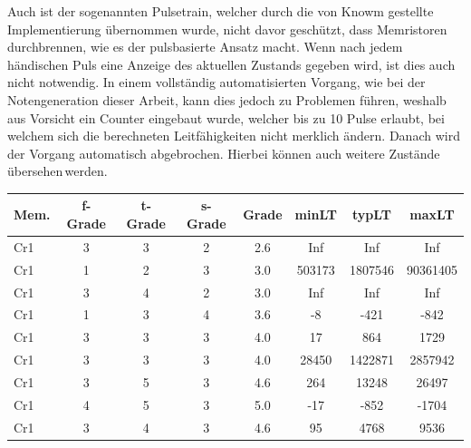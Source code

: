 Auch ist der sogenannten \glqq Pulsetrain\grqq, welcher durch die von Knowm gestellte Implementierung übernommen wurde, nicht davor geschützt, dass Memristoren \glqq durchbrennen\grqq, wie es der pulsbasierte Ansatz macht. Wenn nach jedem händischen Puls eine Anzeige des aktuellen Zustands gegeben wird, ist dies auch nicht notwendig. In einem vollständig automatisierten Vorgang, wie bei der Notengeneration dieser Arbeit, kann dies jedoch zu Problemen führen, weshalb aus Vorsicht ein Counter eingebaut wurde, welcher bis zu 10 Pulse erlaubt, bei welchem sich die berechneten Leitfähigkeiten nicht merklich ändern. Danach wird der Vorgang automatisch abgebrochen. Hierbei können auch weitere Zustände \glqq übersehen\grqq\,werden.

\begin{table}
  \centering
    \begin{tabular}{l|c|c|c|c|c|c|c}
      \textbf{Mem.} & \textbf{f-Grade} & \textbf{t-Grade} & \textbf{s-Grade} & \textbf{Grade} & \textbf{minLT} & \textbf{typLT} & \textbf{maxLT} \\\hline
      Cr1          &  3               & 3                &  2               &  2.6           & Inf            & Inf            & Inf     \\
      Cr1          &  1               & 2                &  3               &  3.0           & 503173         & 1807546        & 90361405\\
      Cr1          &  3               & 4                &  2               &  3.0           & Inf            & Inf            & Inf     \\
      Cr1          &  1               & 3                &  4               &  3.6           & -8             & -421           & -842    \\
      Cr1          &  3               & 3                &  3               &  4.0           & 17             & 864            & 1729    \\
      Cr1          &  3               & 3                &  3               &  4.0           & 28450          & 1422871        & 2857942 \\
      Cr1          &  3               & 5                &  3               &  4.6           & 264            & 13248          & 26497   \\
      Cr1          &  4               & 5                &  3               &  5.0           & -17            & -852           & -1704   \\
      Cr1          &  3               & 4                &  3               &  4.6           & 95             & 4768           & 9536    \\

\end{tabular}
\end{table}
